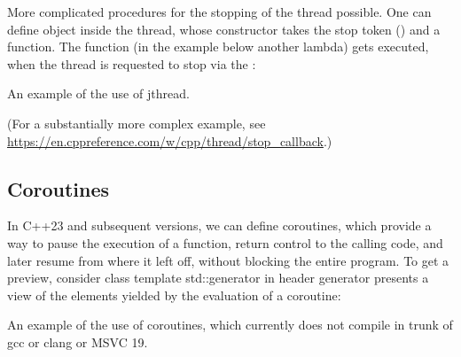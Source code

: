 More complicated procedures for the stopping of the thread possible. One can define  object inside the thread, whose constructor takes the stop token () and a function. The function (in the example below another lambda) gets executed, when the thread is requested to stop via the :

\raggedbottom
\begin{codebox}[]{\href{https://godbolt.org/z/hE4rMznWq}{\ExternalLink}}
\footnotesize An example of the use of jthread.
\tcblower
{}
\end{codebox}

(For a substantially more complex example, see \url{https://en.cppreference.com/w/cpp/thread/stop_callback}.)



\subsection{Coroutines}

In C++23 and subsequent versions, we can define coroutines, which provide a way to pause the execution of a function, return control to the calling code, and later resume from where it left off, without blocking the entire program. To get a preview, consider class template std::generator in header generator presents a view of the elements yielded by the evaluation of a coroutine:

\raggedbottom
\begin{codebox}[]{}
\footnotesize An example of the use of coroutines, which currently does not compile in trunk of gcc or clang or MSVC 19.
\tcblower
{}
\end{codebox}

